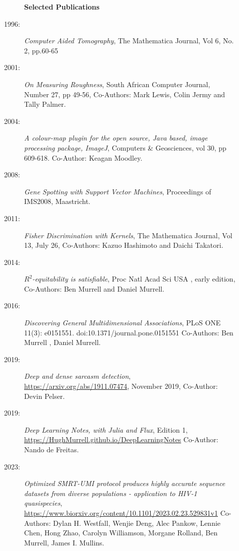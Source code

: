\documentclass[12pt]{article}
\begin{document}
\begin{multicols}{2}
\begin{description}\item[] \begin{description}\item[] {\large \bf  Selected Publications  }
\item[1996:]
      {\it Computer Aided Tomography},
      The Mathematica Journal, Vol 6, No. 2, pp.60-65 
\item[2001:]
      {\it On Measuring Roughness}, South African Computer Journal,
      Number 27, pp 49-56, Co-Authors:
      Mark Lewis, Colin Jermy and Tally Palmer.
 \item[2004:]
      {\it A colour-map plugin for the open source, Java based,
      image processing package, ImageJ},
      Computers \& Geosciences, vol 30, pp 609-618.
      Co-Author: Keagan Moodley. 
\item[2008:]
      {\it Gene Spotting with Support Vector Machines},
      Proceedings of IMS2008,
      Maastricht. 
\item[2011:]
      {\it Fisher Discrimination with Kernels},
      The Mathematica Journal, Vol 13, July 26,
      Co-Authors: Kazuo Hashimoto and Daichi Takatori. 
\item[2014:]
         {\it $R^2$-equitability is satisfiable}, Proc Natl Acad Sci USA , early edition, 
         Co-Authors: Ben Murrell and Daniel Murrell. 
\item[2016:]
         {\it Discovering General Multidimensional Associations},
         PLoS ONE 11(3): e0151551. doi:10.1371/journal.pone.0151551
	Co-Authors: Ben Murrell , Daniel Murrell. 
\item[2019:]
         {\it Deep and dense sarcasm detection},
         \url{https://arxiv.org/abs/1911.07474}, November 2019,
         Co-Author: Devin Pelser. 
 \item[2019:]
 	{\it Deep Learning Notes, with Julia and Flux}, Edition 1,
	\url{https://HughMurrell.github.io/DeepLearningNotes}
	Co-Author: Nando de Freitas. 
\item[2023:]
         {\it Optimized SMRT-UMI protocol produces highly accurate 
         sequence datasets from diverse populations - application to HIV-1 quasispecies},
         \url{https://www.biorxiv.org/content/10.1101/2023.02.23.529831v1}
         Co-Authors: Dylan H. Westfall, Wenjie Deng, Alec Pankow, 
         Lennie Chen, Hong Zhao, Carolyn Williamson, Morgane Rolland, 
         Ben Murrell, James I. Mullins.


\end{description}
\end{description}

\end{multicols}
\end{document}
